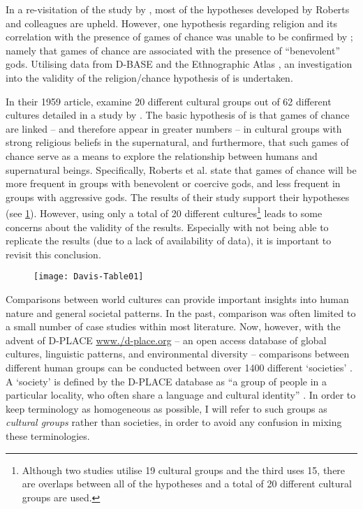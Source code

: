 In a re-visitation of the study by \textcite{chick1998}, most of the hypotheses developed by Roberts and colleagues are upheld. However, one hypothesis regarding religion and its correlation with the presence of games of chance was unable to be confirmed by \textcite[192]{chick1998}; namely that games of chance are associated with the presence of \enquote{benevolent} gods. 
Utilising data from D-BASE and the Ethnographic Atlas \parencites{murdock1962}{barry1980}{gray1999}{korotayev2004}{bondarenko2005}, an investigation into the validity of the religion/chance hypothesis of \textcite{roberts1959} is undertaken.

In their 1959 article, \textcite{roberts1959} examine 20 different cultural groups out of 62 different cultures detailed in a study by \textcite{lambert1959}. The basic hypothesis of \textcite[601--602]{roberts1959} is that games of chance are linked – and therefore appear in greater numbers – in cultural groups with strong religious beliefs in the supernatural, and furthermore, that such games of chance serve as a means to explore the relationship between humans and supernatural beings. Specifically, Roberts et al. state that games of chance will be more frequent in groups with benevolent or coercive gods, and less frequent in groups with aggressive gods. The results of their study support their hypotheses (see \cref{fig:Davis-Table01}). 
However, using only a total of 20 different cultures\footnote{Although two studies utilise 19 cultural groups and the third uses 15, there are overlaps between all of the hypotheses and a total of 20 different cultural groups are used.} leads to some concerns about the validity of the results. Especially with \textcite{chick1998} not being able to replicate the results (due to a lack of availability of data), it is important to revisit this conclusion.
 
 	\begin{figure}[!htb] %
 		\texttt{[image: Davis-Table01]}
 		\centering
 		\label{fig:Davis-Table01}
 	\end{figure}
Comparisons  between world cultures can provide important insights into human nature and general societal patterns. In the past, comparison was often limited to a small number of case studies within most literature. Now, however, with the advent of D-PLACE \href{http:/www./d-place.org}{www./d-place.org} – an open access database of global cultures, linguistic patterns, and environmental diversity – comparisons between different human groups can be conducted between over 1400 different ‘societies’ \parencite{kirby2016}. A ‘society’ is defined by the D-PLACE database as \enquote{a group of people in a particular locality, who often share a language and cultural identity} \parencite{D-PLACE}. In order to keep terminology as homogeneous as possible, I will refer to such groups as \textit{cultural groups} rather than societies, in order to avoid any confusion in mixing these terminologies.
 
